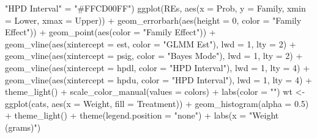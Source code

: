 \documentclass[12pt]{article}
\newenvironment{Shaded}{\begin{snugshade}}{\end{snugshade}}
\newcommand{\AttributeTok}[1]{\textcolor[rgb]{0.77,0.63,0.00}{#1}}
\newcommand{\DecValTok}[1]{\textcolor[rgb]{0.00,0.00,0.81}{#1}}
\newcommand{\FloatTok}[1]{\textcolor[rgb]{0.00,0.00,0.81}{#1}}
\newcommand{\FunctionTok}[1]{\textcolor[rgb]{0.00,0.00,0.00}{#1}}
\newcommand{\NormalTok}[1]{#1}
\newcommand{\OtherTok}[1]{\textcolor[rgb]{0.56,0.35,0.01}{#1}}
\newcommand{\SpecialCharTok}[1]{\textcolor[rgb]{0.00,0.00,0.00}{#1}}
\newcommand{\StringTok}[1]{\textcolor[rgb]{0.31,0.60,0.02}{#1}}
\begin{document}
\begin{Shaded}
\begin{Highlighting}[]
            \StringTok{"HPD Interval"} \OtherTok{=} \StringTok{"\#FFCD00FF"}\NormalTok{)}
\FunctionTok{ggplot}\NormalTok{(REs, }\FunctionTok{aes}\NormalTok{(}\AttributeTok{x =}\NormalTok{ Prob, }\AttributeTok{y =}\NormalTok{ Family, }\AttributeTok{xmin =}\NormalTok{ Lower, }\AttributeTok{xmax =}\NormalTok{ Upper)) }\SpecialCharTok{+}
  \FunctionTok{geom\_errorbarh}\NormalTok{(}\FunctionTok{aes}\NormalTok{(}\AttributeTok{height =} \DecValTok{0}\NormalTok{, }\AttributeTok{color =} \StringTok{"Family Effect"}\NormalTok{)) }\SpecialCharTok{+}
  \FunctionTok{geom\_point}\NormalTok{(}\FunctionTok{aes}\NormalTok{(}\AttributeTok{color =} \StringTok{"Family Effect"}\NormalTok{)) }\SpecialCharTok{+}
  \FunctionTok{geom\_vline}\NormalTok{(}\FunctionTok{aes}\NormalTok{(}\AttributeTok{xintercept =}\NormalTok{ est, }\AttributeTok{color =} \StringTok{"GLMM Est"}\NormalTok{), }\AttributeTok{lwd =} \DecValTok{1}\NormalTok{, }\AttributeTok{lty =} \DecValTok{2}\NormalTok{) }\SpecialCharTok{+}
  \FunctionTok{geom\_vline}\NormalTok{(}\FunctionTok{aes}\NormalTok{(}\AttributeTok{xintercept =}\NormalTok{ psig, }\AttributeTok{color =} \StringTok{"Bayes Mode"}\NormalTok{), }\AttributeTok{lwd =} \DecValTok{1}\NormalTok{, }\AttributeTok{lty =} \DecValTok{2}\NormalTok{) }\SpecialCharTok{+}
  \FunctionTok{geom\_vline}\NormalTok{(}\FunctionTok{aes}\NormalTok{(}\AttributeTok{xintercept =}\NormalTok{ hpdl, }\AttributeTok{color =} \StringTok{"HPD Interval"}\NormalTok{), }\AttributeTok{lwd =} \DecValTok{1}\NormalTok{, }\AttributeTok{lty =} \DecValTok{4}\NormalTok{) }\SpecialCharTok{+}
  \FunctionTok{geom\_vline}\NormalTok{(}\FunctionTok{aes}\NormalTok{(}\AttributeTok{xintercept =}\NormalTok{ hpdu, }\AttributeTok{color =} \StringTok{"HPD Interval"}\NormalTok{), }\AttributeTok{lwd =} \DecValTok{1}\NormalTok{, }\AttributeTok{lty =} \DecValTok{4}\NormalTok{) }\SpecialCharTok{+}
  \FunctionTok{theme\_light}\NormalTok{() }\SpecialCharTok{+}
  \FunctionTok{scale\_color\_manual}\NormalTok{(}\AttributeTok{values =}\NormalTok{ colors) }\SpecialCharTok{+}
  \FunctionTok{labs}\NormalTok{(}\AttributeTok{color =} \StringTok{""}\NormalTok{)}
\NormalTok{wt }\OtherTok{\textless{}{-}} \FunctionTok{ggplot}\NormalTok{(cats, }\FunctionTok{aes}\NormalTok{(}\AttributeTok{x =}\NormalTok{ Weight, }\AttributeTok{fill =}\NormalTok{ Treatment)) }\SpecialCharTok{+} 
  \FunctionTok{geom\_histogram}\NormalTok{(}\AttributeTok{alpha =} \FloatTok{0.5}\NormalTok{) }\SpecialCharTok{+} 
  \FunctionTok{theme\_light}\NormalTok{() }\SpecialCharTok{+} 
  \FunctionTok{theme}\NormalTok{(}\AttributeTok{legend.position =} \StringTok{"none"}\NormalTok{) }\SpecialCharTok{+} 
  \FunctionTok{labs}\NormalTok{(}\AttributeTok{x =} \StringTok{"Weight (grams)"}\NormalTok{)}


\end{Highlighting}
\end{Shaded}
\end{document}
